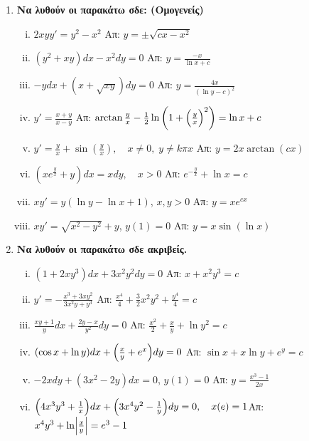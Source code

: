 \begin{enumerate}
  \item {\bfseries Να λυθούν οι παρακάτω σδε: (Ομογενείς)}
    \begin{enumerate}[i)]
      \item $ 2xy y' = y^{2} - x^{2} $ \hfill Απ: $ y = \pm \sqrt{cx-x^{2}} $ 
      \item $ \left(y^{2}+xy\right)dx - x^{2}dy =0 $ 
        \hfill Απ: $ y= \frac{-x}{\ln{x} + c} $ 
      \item $ -ydx+(x+ \sqrt{xy} )dy=0 $ \hfill Απ: $ y= \frac{4x}{(\ln{y} -c)^{2}} $  
      \item $ y'= \frac{x+y}{x-y} $ \hfill Απ: $ \arctan \frac{y}{x} - \frac{1}{2}
        \ln{\left(1 + \Bigl(\frac{y}{x}\Bigr)^{2}\right)} = \ln{x} + c  $  
      \item $y'=\frac{y}{x}+\sin(\frac{y}{x}), \quad x\neq 0,\; y\neq k\pi x$ 
        \hfill Απ: $y=2x\arctan(cx)$
      \item $\left(xe^{\frac{y}{x}}+y\right)dx=xdy, \quad x>0$ 
        \hfill Απ: $e^{-\frac{y}{x}}+\ln x =c$
      \item $ xy'=y(\ln{y} - \ln{x} +1) $, \quad $ x,y>0 $ \hfill Απ: $ y=xe^{cx} $ 
      \item $ xy' = \sqrt{ x^{2}-y^{2} } +y $, \quad $ y(1)=0 $ 
        \hfill Απ: $ y = x \sin{(\ln{x})}$  
    \end{enumerate}

  \item {\bfseries Να λυθούν οι παρακάτω σδε ακριβείς.}
    \begin{enumerate}[i)]
      \item $ (1+2xy^{3})dx + 3x^{2}y^{2}dy = 0 $ 
        \hfill Απ: $x+x^{2}y^{3}=c$ 
      \item $ y'=- \frac{x^{3}+3xy^{2}}{3x^{2}y+y^{3}} $ 
        \hfill Απ: $ \frac{x^{4}}{4} + \frac{3}{2} x^{2}y^{2} + \frac{y^{4}}{4} = c $ 
      \item $ \frac{xy+1}{y} dx + \frac{2y-x}{y^{2}} dy=0 $ 
        \hfill Απ: $ \frac{x^{2}}{2} + \frac{x}{y} + \ln{y^{2}} =c $ 
      \item $ (\cos{x} + \ln{y})dx + \Bigl(\frac{x}{y} + e^{x}\Bigr)dy=0 $ 
        \hfill Απ: $ \sin{x} + x \ln{y} + e^{y}=c $ 
      \item $ -2xdy + (3x^{2}-2y)dx=0 $, \quad $ y(1)=0 $ 
        \hfill Απ: $ y= \frac{x^{3}-1}{2x} $ 
      \item $\Bigl(4x^3y^3+\frac{1}{x}\Bigr)dx+\Bigl(3x^4y^2-\frac{1}{y}\Bigr)dy=0, 
        \quad x(e)=1$\hfill Απ: $x^4y^3+\ln \Bigl|\frac{x}{y}\Bigr|=e^3-1$
    \end{enumerate}


\end{enumerate}
